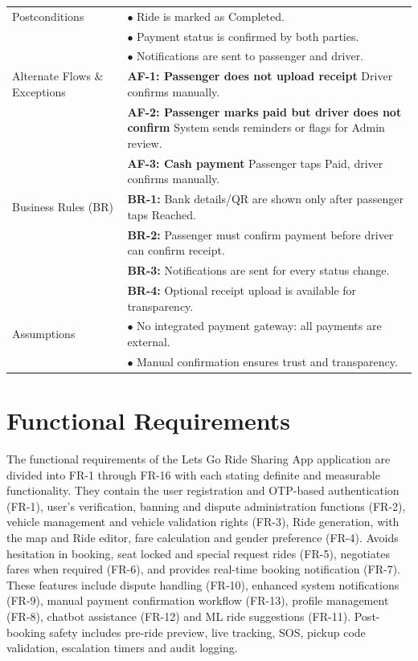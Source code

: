 \begin{longtable}{|>{\raggedright\arraybackslash}p{4cm}|>{\raggedright\arraybackslash}p{11cm}|}
\hline
Postconditions & $\bullet$ Ride is marked as Completed. \\
& $\bullet$ Payment status is confirmed by both parties. \\
& $\bullet$ Notifications are sent to passenger and driver. \\
\hline
Alternate Flows \& Exceptions & \textbf{AF-1: Passenger does not upload receipt} \newline Driver confirms manually. \\
& \textbf{AF-2: Passenger marks paid but driver does not confirm} \newline System sends reminders or flags for Admin review. \\
& \textbf{AF-3: Cash payment} \newline Passenger taps Paid, driver confirms manually. \\
\hline
Business Rules (BR) & \textbf{BR-1:} Bank details/QR are shown only after passenger taps Reached. \\
& \textbf{BR-2:} Passenger must confirm payment before driver can confirm receipt. \\
& \textbf{BR-3:} Notifications are sent for every status change. \\
& \textbf{BR-4:} Optional receipt upload is available for transparency. \\
\hline
Assumptions & $\bullet$ No integrated payment gateway: all payments are external. \\
& $\bullet$ Manual confirmation ensures trust and transparency. \\
\hline
\end{longtable}

\section{Functional Requirements}

The functional requirements of the Lets Go Ride Sharing App application are divided into FR-1 through FR-16 with each stating definite and measurable functionality. They contain the user registration and OTP-based authentication (FR-1), user’s verification, banning and dispute administration functions (FR-2), vehicle management and vehicle validation rights (FR-3), Ride generation, with the map and Ride editor, fare calculation and gender preference (FR-4). Avoids hesitation in booking, seat locked and special request rides (FR-5), negotiates fares when required (FR-6), and provides real-time booking notification (FR-7). These features include dispute handling (FR-10), enhanced system notifications (FR-9), manual payment confirmation workflow (FR-13), profile management (FR-8), chatbot assistance (FR-12) and ML ride suggestions (FR-11). Post-booking safety includes pre-ride preview, live tracking, SOS, pickup code validation, escalation timers and audit logging.

